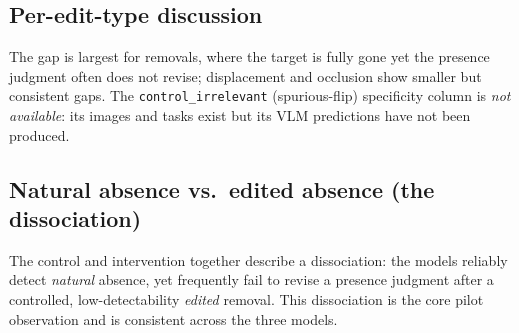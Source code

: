 \subsection{Per-edit-type discussion}
The gap is largest for removals, where the target is fully gone yet the presence judgment
often does not revise; displacement and occlusion show smaller but consistent gaps. The
\texttt{control\_irrelevant} (spurious-flip) specificity column is \emph{not available}: its
images and tasks exist but its VLM predictions have not been produced.

\subsection{Natural absence vs.\ edited absence (the dissociation)}
The control and intervention together describe a dissociation: the models reliably detect
\emph{natural} absence, yet frequently fail to revise a presence judgment after a
controlled, low-detectability \emph{edited} removal. This dissociation is the core pilot
observation and is consistent across the three models.

